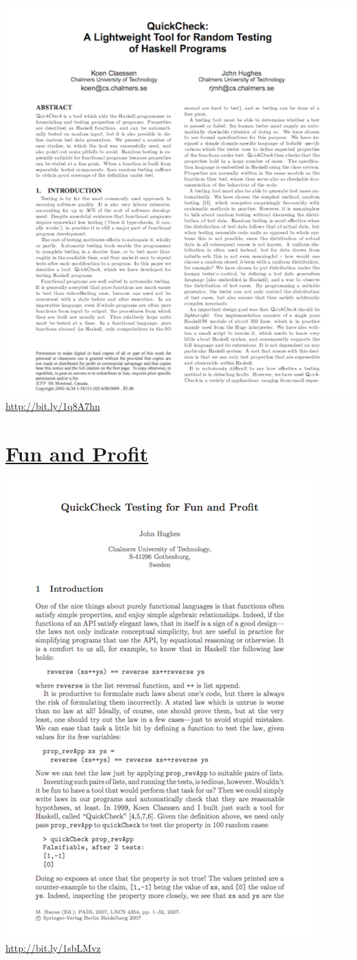 \documentclass[11pt]{article}
\begin{document}
\includegraphics[width=.9\linewidth]{../images/qc_origin_go.png}
\url{http://bit.ly/1q8A7hn}
\section{\href{http://people.inf.elte.hu/center/fulltext.pdf}{Fun and Profit}}
\label{sec-9}

\includegraphics[width=.9\linewidth]{../images/qc_fun_go.png}
\url{http://bit.ly/1sbLMvz}
\end{document}

